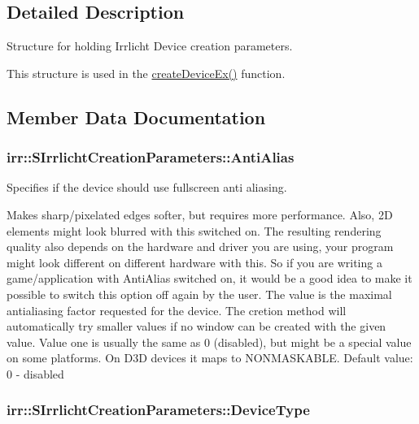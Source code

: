 \subsection{Detailed Description}
Structure for holding Irrlicht Device creation parameters. 

This structure is used in the \hyperlink{namespaceirr_ac83a30d674204dcb94d70f849e9b4a62}{create\+Device\+Ex()} function. 

\subsection{Member Data Documentation}
\subsubsection[{\texorpdfstring{Anti\+Alias}{AntiAlias}}]{ irr\+::\+S\+Irrlicht\+Creation\+Parameters\+::\+Anti\+Alias}\hypertarget{structirr_1_1SIrrlichtCreationParameters_a50602e6ae0cc3d79ca7df0aa8114e75a}{}\label{structirr_1_1SIrrlichtCreationParameters_a50602e6ae0cc3d79ca7df0aa8114e75a}


Specifies if the device should use fullscreen anti aliasing. 

Makes sharp/pixelated edges softer, but requires more performance. Also, 2D elements might look blurred with this switched on. The resulting rendering quality also depends on the hardware and driver you are using, your program might look different on different hardware with this. So if you are writing a game/application with Anti\+Alias switched on, it would be a good idea to make it possible to switch this option off again by the user. The value is the maximal antialiasing factor requested for the device. The cretion method will automatically try smaller values if no window can be created with the given value. Value one is usually the same as 0 (disabled), but might be a special value on some platforms. On D3D devices it maps to N\+O\+N\+M\+A\+S\+K\+A\+B\+LE. Default value\+: 0 -\/ disabled 
\subsubsection[{\texorpdfstring{Device\+Type}{DeviceType}}]{ irr\+::\+S\+Irrlicht\+Creation\+Parameters\+::\+Device\+Type}\hypertarget{structirr_1_1SIrrlichtCreationParameters_a76520addbdf96ee3b3f00cb7f55076e5}{}\label{structirr_1_1SIrrlichtCreationParameters_a76520addbdf96ee3b3f00cb7f55076e5}


